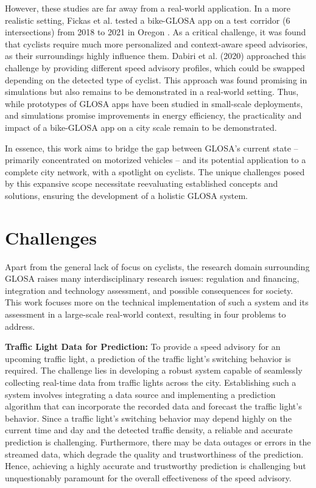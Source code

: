 However, these studies are far away from a real-world application. In a more realistic setting, Fickas et al. tested a bike-GLOSA app on a test corridor (6 intersections) from 2018 to 2021 in Oregon \cite{fickas_project_2018, fickas_riding_2019, fickas_fast_2019, fickas_green_2021, fickas_using_2021, fickas_data_2021}. As a critical challenge, it was found that cyclists require much more personalized and context-aware speed advisories, as their surroundings highly influence them. Dabiri et al. (2020) \cite{dabiri_optimized_2020} approached this challenge by providing different speed advisory profiles, which could be swapped depending on the detected type of cyclist. This approach was found promising in simulations but also remains to be demonstrated in a real-world setting. Thus, while prototypes of GLOSA apps have been studied in small-scale deployments, and simulations promise improvements in energy efficiency, the practicality and impact of a bike-GLOSA app on a city scale remain to be demonstrated.

In essence, this work aims to bridge the gap between GLOSA's current state -- primarily concentrated on motorized vehicles -- and its potential application to a complete city network, with a spotlight on cyclists. The unique challenges posed by this expansive scope necessitate reevaluating established concepts and solutions, ensuring the development of a holistic GLOSA system.

\section{Challenges}

Apart from the general lack of focus on cyclists, the research domain surrounding GLOSA raises many interdisciplinary research issues: regulation and financing, integration and technology assessment, and possible consequences for society. This work focuses more on the technical implementation of such a system and its assessment in a large-scale real-world context, resulting in four problems to address.

\textbf{\color{cidarkblue}Traffic Light Data for Prediction:} To provide a speed advisory for an upcoming traffic light, a prediction of the traffic light's switching behavior is required. The challenge lies in developing a robust system capable of seamlessly collecting real-time data from traffic lights across the city. Establishing such a system involves integrating a data source and implementing a prediction algorithm that can incorporate the recorded data and forecast the traffic light's behavior. Since a traffic light's switching behavior may depend highly on the current time and day and the detected traffic density, a reliable and accurate prediction is challenging. Furthermore, there may be data outages or errors in the streamed data, which degrade the quality and trustworthiness of the prediction. Hence, achieving a highly accurate and trustworthy prediction is challenging but unquestionably paramount for the overall effectiveness of the speed advisory.

